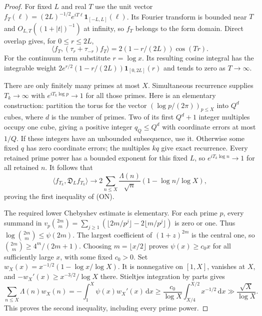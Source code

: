 \documentclass[11pt]{article}
\theoremstyle{remark}\newtheorem{remark}[theorem]{Remark}
\newcommand{\dd}{\,\mathrm d}
\begin{document}
\begin{proof}
For fixed $L$ and real $T$ use the unit vector
$f_T(\ell)=(2L)^{-1/2}e^{iT\ell}\mathbf1_{[-L,L]}(\ell)$.
Its Fourier transform is bounded near $T$ and
$O_{L,T}((1+|t|)^{-1})$ at infinity, so $f_T$ belongs
to the form domain. Direct overlap gives, for $0\le r\le2L$,
\[
 \langle f_T,(\tau_r+\tau_{-r})f_T\rangle
       =2(1-r/(2L))\cos(Tr).
\]
For the continuum term substitute $r=\log x$.
Its resulting cosine integral has the integrable weight
$2e^{r/2}(1-r/(2L))\mathbf1_{[0,2L]}(r)$ and tends
to zero as $T\to\infty$.

There are only finitely many primes at most $X$. Simultaneous
recurrence supplies $T_k\to\infty$ with
$e^{iT_k\log p}\to1$ for all those primes.
Here is an elementary construction: partition the torus for
the vector $(\log p/(2\pi))_{p\le X}$ into $Q^d$ cubes,
where $d$ is the number of primes. Two of its first $Q^d+1$
integer multiples occupy one cube, giving a positive integer
$q_Q\le Q^d$ with coordinate errors at most $1/Q$.
If these integers have an unbounded subsequence, use it.
Otherwise some fixed $q$ has zero coordinate errors; the
multiples $kq$ give exact recurrence.
Every retained prime power has a bounded exponent for this
fixed $L$, so $e^{iT_k\log n}\to1$ for all retained $n$.
It follows that
\[
 \langle f_{T_k},\mathfrak D_Lf_{T_k}\rangle
 \longrightarrow
 2\sum_{n\le X}\frac{\Lambda(n)}{\sqrt n}
                      (1-\log n/\log X),
\]
proving the first inequality of (ON).

The required lower Chebyshev estimate is elementary.
For each prime $p$, every summand in
$v_p\binom{2m}{m}=\sum_{j\ge1}
(\lfloor2m/p^j\rfloor-2\lfloor m/p^j\rfloor)$
is zero or one. Thus
$\log\binom{2m}{m}\le\psi(2m)$.
The largest coefficient of $(1+z)^{2m}$ is the central one,
so $\binom{2m}{m}\ge4^m/(2m+1)$.
Choosing $m=\lfloor x/2\rfloor$ proves
$\psi(x)\ge c_0x$ for all sufficiently large $x$, with
some fixed $c_0>0$.
Set $w_X(x)=x^{-1/2}(1-\log x/\log X)$.
It is nonnegative on $[1,X]$, vanishes at $X$, and
$-w_X'(x)\ge x^{-3/2}/\log X$ there.
Stieltjes integration by parts gives
\[
 \sum_{n\le X}\Lambda(n)w_X(n)
 =-\int_1^X\psi(x)w_X'(x)\dd x
 \ge\frac{c_0}{\log X}\int_{X/4}^{X/2}x^{-1/2}\dd x
 \gg\frac{\sqrt X}{\log X}.
\]
This proves the second inequality, including every prime power.


\end{proof}
\end{document}
